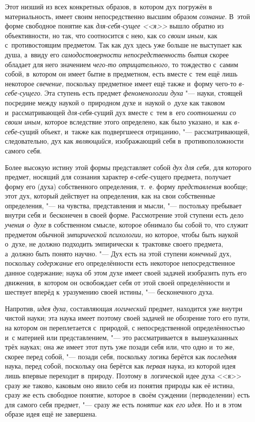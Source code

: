 Этот низший из всех конкретных образов, в~котором дух погружён
в материальность, имеет своим непосредственно высшим образом
{\em сознание}. В~этой
форме свободное понятие как
{\em для-себя-сущее <<я>>}
вышло обратно из объективности, но так, что соотносится с
нею, как со {\em своим иным,}
как с~противостоящим предметом. Так как дух здесь уже больше
не выступает как душа, а~ввиду его
{\em самодостоверности
непосредственность бытия} скорее обладает для него значением
{\em чего-то отрицательного,}
то тождество с~самим собой, в~котором он имеет бытие в
предметном, есть вместе с~тем ещё лишь некоторое
{\em свечение,} поскольку
предметное имеет ещё также и~форму чего-то
{\em в-себе-сущего}. Эта
ступень есть предмет {\em феноменологии
духа} "--- науки, стоящей посредине между наукой о~природном
духе и~наукой о~духе как таковом и~рассматривающей
{\em для-себя}-сущий
дух вместе с~тем в~его {\em соотношении
со своим иным,} которое вследствие этого определено, как
было указано, и~как
{\em в-себе}-сущий
объект, и~также как подвергшееся отрицанию, "---
рассматривающей, следовательно, дух как
{\em являющийся,}
изображающий себя в~противоположности самого себя.

Более высокую истину этой формы представляет собой
{\em дух для себя,} для
которого предмет, носящий для сознания характер
{\em в-себе-}сущего
предмета, получает форму его (духа) собственного определения, т.~е. форму
{\em представления}
вообще; этот дух, который действует на определения, как на
свои собственные определения, "--- на чувства, представления и
мысли, "--- постольку пребывает внутри себя и~бесконечен в
своей форме. Рассмотрение этой ступени есть дело
{\em учения о~духе} в
собственном смысле, которое обнимало бы собой то, что служит предметом
обычной {\em эмпирической психологии,}
но которое, чтобы быть наукой о~духе, не должно подходить
эмпирически к~трактовке своего предмета, а~должно быть понято научно. "---
Дух есть на этой ступени
{\em конечный} дух,
поскольку {\em содержание}
его определённости есть некоторое непосредственное данное
содержание; наука об этом духе имеет своей задачей изобразить путь его
движения, в~котором он освобождает себя от этой своей определённости и
шествует вперёд к~уразумению своей истины, "--- бесконечного
духа.

Напротив, {\em идея духа,}
составляющая
{\em логический} предмет,
находится уже внутри чистой науки; эта наука имеет поэтому своей задачей не
обозрение того его пути, на котором он переплетается с~природой, с
непосредственной определённостью и~с материей или
представлением, "--- это рассматривается в~вышеуказанных трёх
науках; она же имеет этот путь уже позади себя или, что одно и~то же,
скорее перед собой, "--- позади себя, поскольку логика берётся
как {\em последняя}
наука, перед собой, поскольку она берётся как
{\em первая} наука, из
которой идея лишь впервые переходит в~природу. Поэтому в~логической идее
духа <<я>> сразу же таково, каковым оно явило себя из понятия природы как её
истина, сразу же есть свободное понятие, которое в~своём суждении
(перводелении) есть для самого себя предмет, "--- сразу же есть
{\em понятие как его идея}.
Но и~в этом образе идея ещё не завершена.

